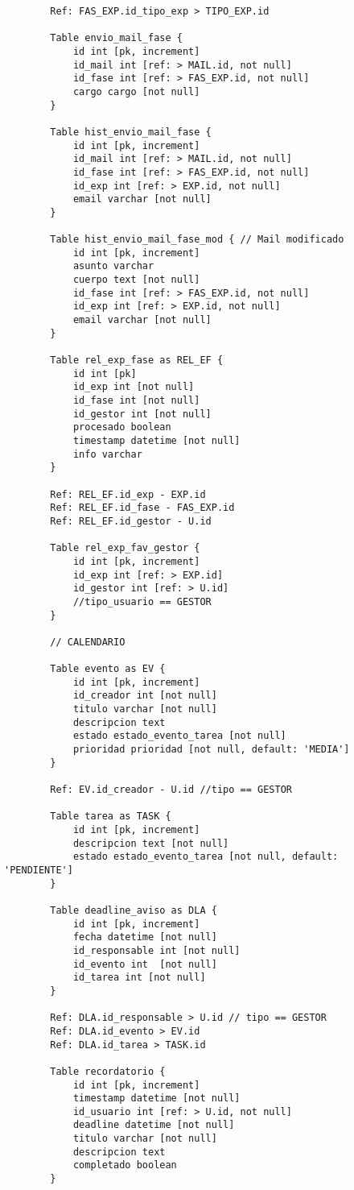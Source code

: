 \begin{lstlisting}
		Ref: FAS_EXP.id_tipo_exp > TIPO_EXP.id
		
		Table envio_mail_fase {
			id int [pk, increment]
			id_mail int [ref: > MAIL.id, not null]
			id_fase int [ref: > FAS_EXP.id, not null]
			cargo cargo [not null]
		}
		
		Table hist_envio_mail_fase {
			id int [pk, increment]
			id_mail int [ref: > MAIL.id, not null]
			id_fase int [ref: > FAS_EXP.id, not null]
			id_exp int [ref: > EXP.id, not null]
			email varchar [not null]
		}
		
		Table hist_envio_mail_fase_mod { // Mail modificado
			id int [pk, increment]
			asunto varchar
			cuerpo text [not null]
			id_fase int [ref: > FAS_EXP.id, not null]
			id_exp int [ref: > EXP.id, not null]
			email varchar [not null]
		}
		
		Table rel_exp_fase as REL_EF {
			id int [pk]
			id_exp int [not null]
			id_fase int [not null]
			id_gestor int [not null]
			procesado boolean 
			timestamp datetime [not null]
			info varchar
		}
		
		Ref: REL_EF.id_exp - EXP.id
		Ref: REL_EF.id_fase - FAS_EXP.id
		Ref: REL_EF.id_gestor - U.id
		
		Table rel_exp_fav_gestor { 
			id int [pk, increment]
			id_exp int [ref: > EXP.id]
			id_gestor int [ref: > U.id]
			//tipo_usuario == GESTOR
		}
		
		// CALENDARIO
		
		Table evento as EV {
			id int [pk, increment]
			id_creador int [not null]
			titulo varchar [not null]
			descripcion text
			estado estado_evento_tarea [not null]
			prioridad prioridad [not null, default: 'MEDIA']
		}
		
		Ref: EV.id_creador - U.id //tipo == GESTOR
		
		Table tarea as TASK {
			id int [pk, increment]
			descripcion text [not null]
			estado estado_evento_tarea [not null, default: 'PENDIENTE']
		}
		
		Table deadline_aviso as DLA { 
			id int [pk, increment]
			fecha datetime [not null]
			id_responsable int [not null]
			id_evento int  [not null]
			id_tarea int [not null]
		}
		
		Ref: DLA.id_responsable > U.id // tipo == GESTOR
		Ref: DLA.id_evento > EV.id
		Ref: DLA.id_tarea > TASK.id
		
		Table recordatorio {
			id int [pk, increment]
			timestamp datetime [not null]
			id_usuario int [ref: > U.id, not null]
			deadline datetime [not null]
			titulo varchar [not null]
			descripcion text
			completado boolean
		}
		

\end{lstlisting}
